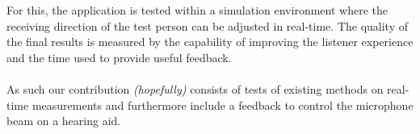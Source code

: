 For this, the application is tested within a simulation environment where the receiving direction of the test person can be adjusted in real-time. 
The quality of the final results is measured by the capability of improving the listener experience and the time used to provide useful feedback. 
\\ \\
As such our contribution \textit{(hopefully)} consists of tests of existing methods on real-time measurements and furthermore include a feedback to control the microphone beam on a hearing aid. 
